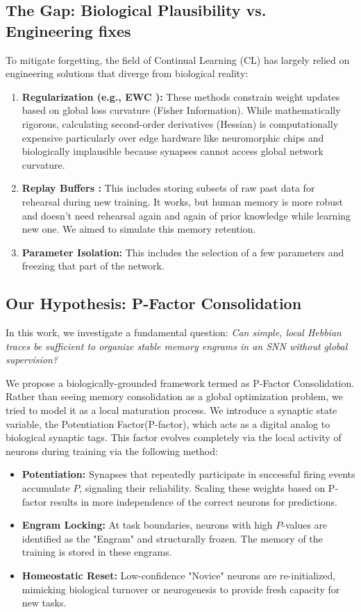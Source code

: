\documentclass[5p,times]{elsarticle}
\begin{document}
\subsection{The Gap: Biological Plausibility vs. Engineering fixes}
To mitigate forgetting, the field of Continual Learning (CL) has largely relied on engineering solutions that diverge from biological reality:
\begin{enumerate}
    \item \textbf{Regularization (e.g., EWC \cite{Kirkpatrick2017}):} These methods constrain weight updates based on global loss curvature (Fisher Information). While mathematically rigorous, calculating second-order derivatives (Hessian) is computationally expensive particularly over edge hardware like neuromorphic chips and biologically implausible because synapses cannot access global network curvature.
    \item \textbf{Replay Buffers \cite{Rebuffi2017}:} This includes storing subsets of raw past data for rehearsal during new training. It works, but human memory is more robust and doesn't need rehearsal again and again of prior knowledge while learning new one. We aimed to simulate this memory retention.
    \item \textbf{Parameter Isolation:} This includes the selection of a few parameters and freezing that part of the network.
\end{enumerate}

\subsection{Our Hypothesis: P-Factor Consolidation}
In this work, we investigate a fundamental question: \textit{Can simple, local Hebbian traces be sufficient to organize stable memory engrams in an SNN without global supervision?}

We propose a biologically-grounded framework termed as P-Factor Consolidation. Rather than seeing memory consolidation as a global optimization problem, we tried to model it as a local maturation process. We introduce a synaptic state variable, the Potentiation Factor(P-factor), which acts as a digital analog to biological synaptic tags. This factor evolves completely via the local activity of neurons during training via the following method:
\begin{itemize}
    \item \textbf{Potentiation:} Synapses that repeatedly participate in successful firing events accumulate $P$, signaling their reliability. Scaling these weights based on P-factor results in more independence of the correct neurons for predictions.
    \item \textbf{Engram Locking:} At task boundaries, neurons with high $P$-values are identified as the "Engram" and structurally frozen. The memory of the training is stored in these engrams.
    \item \textbf{Homeostatic Reset:} Low-confidence "Novice" neurons are re-initialized, mimicking biological turnover or neurogenesis to provide fresh capacity for new tasks.
\end{itemize}
\end{document}

